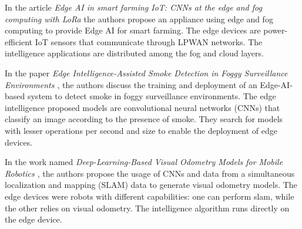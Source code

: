 
In the article \textit{Edge AI in smart farming IoT: CNNs at the edge and fog computing with LoRa \cite{gia2019edge}} the authors propose an appliance using edge and fog computing to provide Edge AI for smart farming. The edge devices are power-efficient IoT sensors that communicate through LPWAN networks. The intelligence applications are distributed among the fog and cloud layers. 



In the paper \textit{Edge Intelligence-Assisted Smoke Detection in Foggy Surveillance Environments \cite{muhammad2019edge}}, the authors discuss the training and deployment of an Edge-AI-based system to detect smoke in foggy surveillance environments. The edge intelligence proposed models are convolutional neural networks (CNNs) that classify an image according to the presence of smoke. They search for models with lesser operations per second and size to enable the deployment of edge devices.



In the work named \textit{Deep-Learning-Based Visual Odometry Models for Mobile Robotics \cite{de2021deep}}, the authors propose the usage of CNNs and data from a simultaneous localization and mapping (SLAM) data to generate visual odometry models. The edge devices were robots with different capabilities: one can perform slam, while the other relies on visual odometry. The intelligence algorithm runs directly on the edge device.


